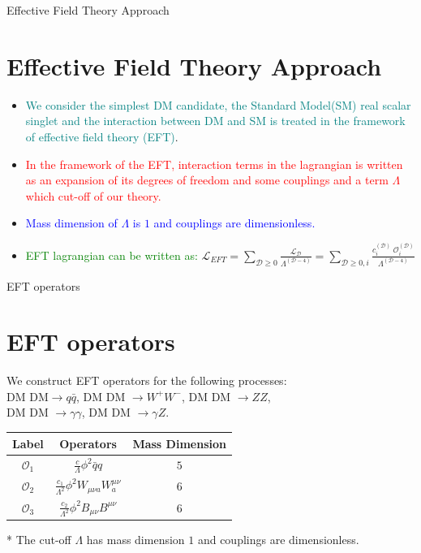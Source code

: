 \documentclass[11pt]{beamer}
\begin{document}
\begin{frame}{Effective Field Theory Approach}

\section{Effective Field Theory Approach}

\begin{itemize}

\item \textcolor{teal}{We consider the simplest DM candidate, the Standard Model(SM) real scalar singlet and the interaction between DM and SM is treated in the framework of effective field theory (EFT)}.
\item \textcolor{red}{In the framework of the EFT, interaction terms in the lagrangian is written
as an expansion of its degrees of freedom and some couplings and a term $\Lambda$ which cut-off of our theory.}
\item \textcolor{blue}{Mass dimension of $\Lambda$ is $1$ and couplings are dimensionless.}
\item \textcolor{green}{EFT lagrangian can be written as:} $\mathscr{L}_{EFT}= \sum_{\mathscr{D}\geq 0} \frac{\mathscr{L}_\mathscr{D}}{\Lambda^{(\mathscr{D}-4)}}= \sum_{\mathscr{D}\geq 0 ,i} \frac{c_i^{(\mathscr{D})}\; \mathcal{O}_i^{(\mathscr{D})}}{\Lambda^{(\mathscr{D}-4)}}$


\end{itemize}
\end{frame}








\begin{frame}{EFT operators}

\section{EFT operators}

We construct EFT operators for the following processes:\\ 
DM DM$\longrightarrow q \bar{q}$, DM DM $\longrightarrow W^+W^-$, DM DM $\longrightarrow ZZ$, \\DM DM $\longrightarrow \gamma \gamma$, DM DM $\longrightarrow \gamma Z$.
\begin{center}
\begin{tabular}{|c|c|c|}
\hline
Label & Operators & Mass Dimension\\ \hline
$\mathcal{O}_1$ & $\frac{c}{\Lambda} \phi^2 \bar{q}q $ & $5$\\ \hline
$\mathcal{O}_2$ & $\frac{c_1}{\Lambda^2} \phi^2 W_{\mu \nu a} W^{\mu \nu}_a$ & $6$ \\ \hline

$\mathcal{O}_3$ & $\frac{c_2}{\Lambda^2} \phi^2 B_{\mu \nu} B^{\mu \nu}$ & $6$\\ \hline
\end{tabular}
\end{center}

* The cut-off $\Lambda$ has mass dimension $1$ and couplings are dimensionless.
\end{frame}
\end{document}
